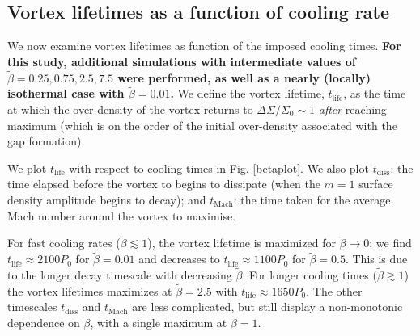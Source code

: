 

\subsection{Vortex lifetimes as a function of cooling
  rate}\label{lifetime_discuss} 

We now examine vortex lifetimes as function of the imposed cooling
times. {\bf For this study, additional simulations with intermediate
  values of $\tilde\beta=0.25,0.75,2.5,7.5$ were performed, as well as
  a nearly (locally) isothermal case with $\tilde{\beta}=0.01$.} 
 We define the vortex lifetime, $t_{\mathrm{life}}$, as the time
at which the over-density of the vortex
returns to $\Delta \Sigma/\Sigma_0\sim1$ \emph{after} reaching maximum
 (which is on the order of the
initial over-density associated with the gap formation). 

We plot $t_{\mathrm{life}}$ with respect to cooling times in
Fig. \ref{betaplot}. We also plot $t_{\mathrm{diss}}$: the time elapsed before the
vortex to begins to dissipate (when the $m=1$ surface density
amplitude begins to decay); and $t_{\mathrm{Mach}}$: the time taken
for the average Mach number around the vortex to maximise. 

For fast cooling rates ($\tilde{\beta}\lesssim 1$), the
vortex lifetime is maximized for $\tilde{\beta}\to0$: we find 
$t_{\mathrm{life}} \approx 2100P_0$ for $\tilde{\beta}=0.01$ and 
decreases to $t_{\mathrm{life}} \approx 1100P_0$ for
$\tilde{\beta}=0.5$. This is due to the longer decay timescale with
decreasing $\tilde{\beta}$. For longer cooling times ($\tilde{\beta}\gtrsim
1$) the vortex lifetimes maximizes at $\tilde\beta=2.5$ with 
$t_{\mathrm{life}}\approx 1650P_0$.  The other timescales $t_\mathrm{diss}$ and
$t_\mathrm{Mach}$ are less complicated, but still display a
non-monotonic dependence on $\tilde{\beta}$, with a single maximum at
$\tilde{\beta}=1$. 

